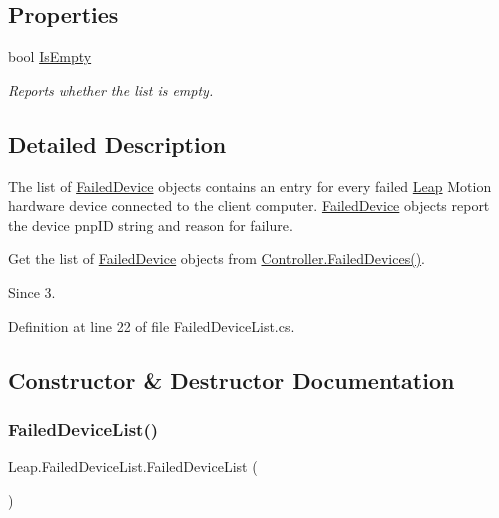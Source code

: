 \subsection*{Properties}
\begin{DoxyCompactItemize}
\item 
bool \mbox{\hyperlink{class_leap_1_1_failed_device_list_a616c339feb565a9745fedbfc2c2e6361}{Is\+Empty}}
\begin{DoxyCompactList}\small\item\em Reports whether the list is empty. \end{DoxyCompactList}\end{DoxyCompactItemize}


\subsection{Detailed Description}
The list of \mbox{\hyperlink{class_leap_1_1_failed_device}{Failed\+Device}} objects contains an entry for every failed \mbox{\hyperlink{namespace_leap}{Leap}} Motion hardware device connected to the client computer. \mbox{\hyperlink{class_leap_1_1_failed_device}{Failed\+Device}} objects report the device pnp\+ID string and reason for failure. 

Get the list of \mbox{\hyperlink{class_leap_1_1_failed_device}{Failed\+Device}} objects from \mbox{\hyperlink{class_leap_1_1_controller_ab73815d54d49bf570371fe1ec39fe770}{Controller.\+Failed\+Devices()}}.

\begin{DoxySince}{Since}
3. 
\end{DoxySince}


Definition at line 22 of file Failed\+Device\+List.\+cs.



\subsection{Constructor \& Destructor Documentation}
\mbox{\label{class_leap_1_1_failed_device_list_a52c703c8c2eee1e7a380c2fb383090d6}} 
\subsubsection{\texorpdfstring{FailedDeviceList()}{FailedDeviceList()}}
{\footnotesize\ttfamily Leap.\+Failed\+Device\+List.\+Failed\+Device\+List (\begin{DoxyParamCaption}{ }\end{DoxyParamCaption})}



